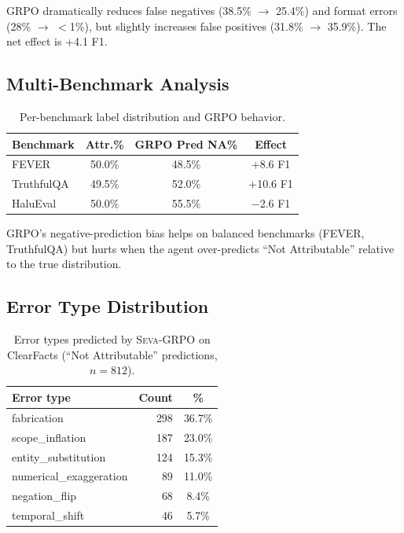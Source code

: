 \documentclass{article}
\newcommand{\seva}{\textsc{Seva}\xspace}
\begin{document}
GRPO dramatically reduces false negatives (38.5\% $\to$ 25.4\%) and format errors (28\% $\to$ $<$1\%), but slightly increases false positives (31.8\% $\to$ 35.9\%).
The net effect is +4.1 F1.

\subsection{Multi-Benchmark Analysis}

\begin{table}[h]
\centering
\small
\caption{Per-benchmark label distribution and GRPO behavior.}
\label{tab:benchmark_analysis}
\setlength{\tabcolsep}{3pt}
\begin{tabular}{lccc}
\toprule
\textbf{Benchmark} & \textbf{Attr.\%} & \textbf{GRPO Pred NA\%} & \textbf{Effect} \\
\midrule
FEVER & 50.0\% & 48.5\% & +8.6 F1 \\
TruthfulQA & 49.5\% & 52.0\% & +10.6 F1 \\
HaluEval & 50.0\% & 55.5\% & $-$2.6 F1 \\
\bottomrule
\end{tabular}
\end{table}

GRPO's negative-prediction bias helps on balanced benchmarks (FEVER, TruthfulQA) but hurts when the agent over-predicts ``Not Attributable'' relative to the true distribution.

\subsection{Error Type Distribution}
\label{app:errors}

\begin{table}[h]
\centering
\small
\caption{Error types predicted by \seva-GRPO on ClearFacts (``Not Attributable'' predictions, $n{=}812$).}
\label{tab:error_dist}
\begin{tabular}{lrc}
\toprule
\textbf{Error type} & \textbf{Count} & \textbf{\%} \\
\midrule
fabrication & 298 & 36.7\% \\
scope\_inflation & 187 & 23.0\% \\
entity\_substitution & 124 & 15.3\% \\
numerical\_exaggeration & 89 & 11.0\% \\
negation\_flip & 68 & 8.4\% \\
temporal\_shift & 46 & 5.7\% \\
\bottomrule
\end{tabular}
\end{table}
\end{document}
